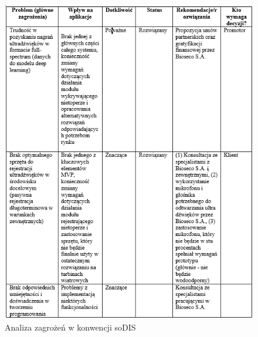 \documentclass{sprz}
\begin{document}
\begin{figure}[h]
  \centering
  \includegraphics[width=1.0\textwidth]{sprz/sodis1.png}
  \caption{Analiza zagrożeń w konwencji soDIS}
  \label{img:sodis1}
\end{figure}
\end{document}
